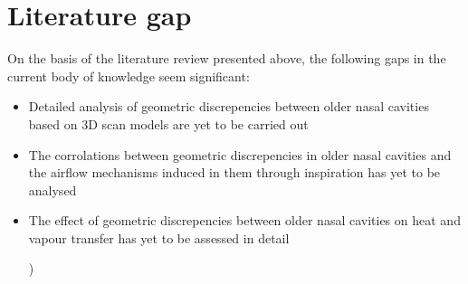 \section{Literature gap}

On the basis of the literature review presented above, the following gaps in the current body of knowledge seem significant:

\begin{itemize}

  \item Detailed analysis of geometric discrepencies between older nasal cavities based on 3D scan models are yet to be carried out

  \item The corrolations between geometric discrepencies in older nasal cavities and the airflow mechanisms induced in them through inspiration has yet to be analysed

  \item The effect of geometric discrepencies between older nasal cavities on heat and vapour transfer has yet to be assessed in detail

)\end{itemize}
